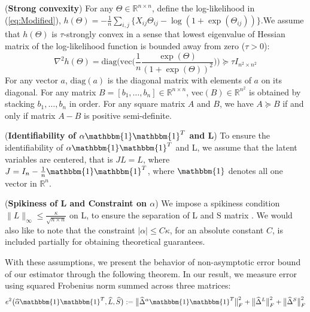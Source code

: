 \documentclass[AMS,STIX1COL]{WileyNJD-v2}
\begin{document}
{\begin{assumption}(\textbf{Strong convexity})  \label{Ass:1}
For any $\Theta \in \mathbb{R}^{n\times n}$, define the log-likelihood in (\ref{eq:Modified}), $h(\Theta) = -\frac{1}{n}\sum_{i,j} \big\{ X_{ij}\Theta_{ij} - \log(1+\exp(\Theta_{ij})) \big\}$.We assume that $h(\Theta)$ is $\tau$-strongly convex in a sense that lowest eigenvalue of Hessian matrix of the log-likelihood function is bounded away from zero ($\tau > 0$):
\[
\nabla^{2}h(\Theta) = \mbox{diag}\Big(\mbox{vec}\Big(\frac{1}{n}\frac{\exp(\Theta)}{(1+\exp(\Theta))^{2}}
\Big)\Big) \succcurlyeq \tau I_{n^{2} \times n^{2}}
\]
For any vector $a$, $\mbox{diag}(a)$ is the diagonal matrix with elements of $a$ on its diagonal.
For any matrix $B=[b_1,\dots,b_n]\in\mathbb{R}^{n \times n}$, $\mbox{vec}(B)\in\mathbb{R}^{n^2}$ is obtained by stacking $ b_1,\dots, b_{n}$ in order.
For any square matrix $A$ and $B$, we have $ A \succcurlyeq B $ if and only if matrix $A-B$ is positive semi-definite.
\end{assumption}

\begin{assumption} (\textbf{Identifiability of $\alpha\mathbbm{1}\mathbbm{1}^T$ and L}) \label{Ass:2}
To ensure the identifiability of $\alpha\mathbbm{1}\mathbbm{1}^T$ and L, we assume that the latent variables are centered, that is $JL=L$, where $J=I_{n}-\frac{1}{n}\mathbbm{1}\mathbbm{1}^T$, where $\mathbbm{1}$ denotes all one vector in $\mathbb{R}^{n}$.
\end{assumption}

\begin{assumption} (\textbf{Spikiness of L and Constraint on $\alpha$}) \label{Ass:3}
We impose a spikiness condition $\|L\|_{\infty}\leq\frac{\kappa}{\sqrt{n \times n}}$ on L, to ensure the separation of L and S matrix \cite{agarwal2012noisy}. We would also like to note that the constraint $|\alpha|\leq C\kappa$, for an absolute constant $C$, is included partially for obtaining theoretical guarantees.
\end{assumption}

With these assumptions, we present the behavior of non-asymptotic error bound of our estimator through the following theorem. In our result, we measure error using squared Frobenius norm summed across three matrices:
\[
    e^{2}\big(\widehat{\alpha}\mathbbm{1}\mathbbm{1}^T,\widehat{L},\widehat{S}\big)
    :=\big\|\widehat{\Delta}^{\alpha}\mathbbm{1}\mathbbm{1}^T\big\|_{F}^{2} + \big\|\widehat{\Delta}^{L}\big\|_{F}^{2} + \big\|\widehat{\Delta}^{S}\big\|_{F}^{2}
\]

}
\end{document}
